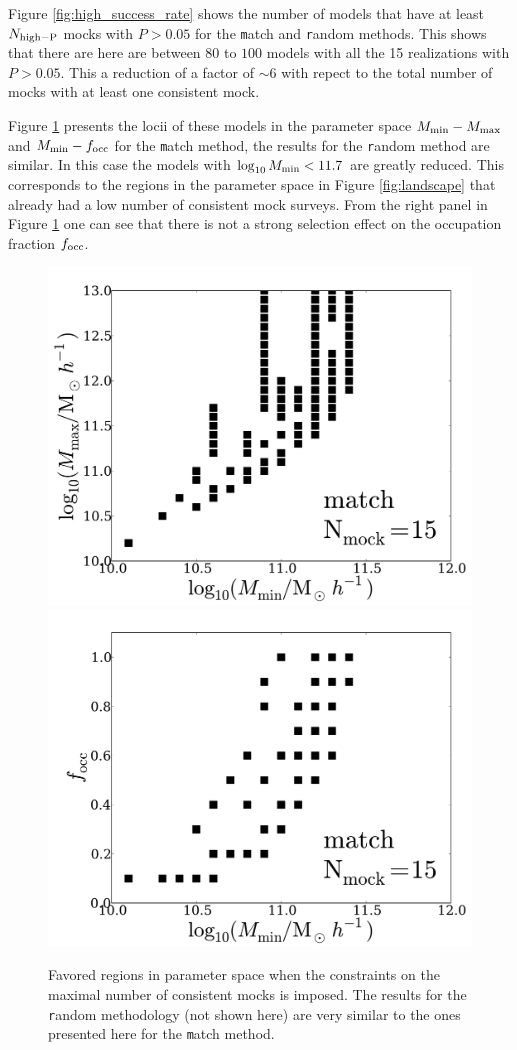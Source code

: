 \documentclass[usenatbib]{mn2e}
\begin{document}
Figure \ref{fig:high_success_rate} shows the number of models
that have at least $N_{\rm high-P}$ mocks with $P>0.05$ for the {\texttt
  match} and {\texttt random} methods.  This shows that there are
here are between $80$ to $100$ models with all the 15 realizations with
$P>0.05$. This a reduction of a factor of $\sim 6$ with repect to the
total number of mocks with at least one consistent mock. 

Figure \ref{fig:restriction_mock} presents the locii of these models
in the parameter space $M_{\rm min}-M_{\rm max}$ and $M_{\rm
  min}-f_{\rm occ}$ for the {\texttt match} method, the results for
the {\texttt random} method are similar. In this case the models with
$\log_{10}M_{\rm min}< 11.7$ are greatly reduced. This corresponds to
the regions in the parameter space in Figure \ref{fig:landscape} that
already had a low number of consistent mock surveys. From the right
panel in Figure \ref{fig:restriction_mock} one can see that there is
not a strong selection effect on the occupation fraction $f_{\rm
  occ}$. 


\begin{figure}
\begin{center}
\includegraphics[width=0.46\linewidth,angle=0]{./plots/Fig5_match_mass_mock.pdf}
\hspace{5mm}
\includegraphics[width=0.46\linewidth,angle=0]{./plots/Fig5_match_f_occ_mock.pdf}
\end{center} 
\caption{Favored regions in parameter space when the constraints on
  the maximal number of consistent mocks is imposed. The results for
  the {\texttt random} methodology (not shown here) are very similar to the ones
  presented here for the {\texttt match} method.
  \label{fig:restriction_mock}}  
\end{figure}
\end{document}
